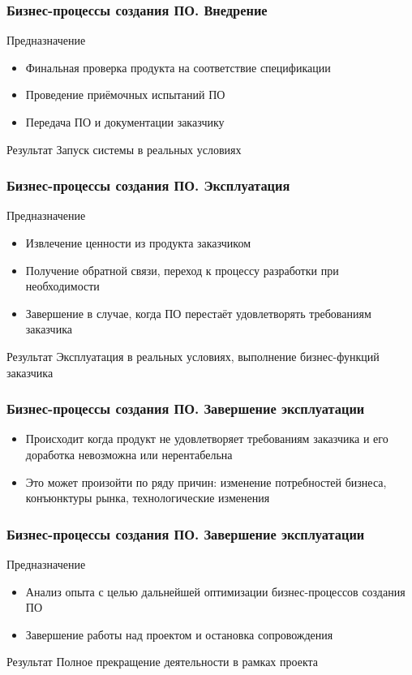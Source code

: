 \documentclass{../industrial-development}
\begin{document}
\begin{frame} \frametitle{Бизнес-процессы создания ПО. Внедрение}
	\begin{block}{Предназначение}
		\begin{itemize}
			\item Финальная проверка продукта на соответствие спецификации
			\item Проведение приёмочных испытаний ПО
			\item Передача ПО и документации заказчику
		\end{itemize}
	\end{block}
	\begin{block}{Результат}
		Запуск системы в реальных условиях
	\end{block}
\end{frame}
\lecturenotes


\begin{frame} \frametitle{Бизнес-процессы создания ПО. Эксплуатация}
	\begin{block}{Предназначение}
		\begin{itemize}
			\item Извлечение ценности из продукта заказчиком
			\item Получение обратной связи, переход к процессу разработки при необходимости
			\item Завершение в случае, когда ПО перестаёт удовлетворять требованиям заказчика
		\end{itemize}
	\end{block}
	\begin{block}{Результат}
		Эксплуатация в реальных условиях, выполнение бизнес-функций заказчика
	\end{block}
\end{frame}
\lecturenotes


\begin{frame} \frametitle{Бизнес-процессы создания ПО. Завершение эксплуатации}
	\begin{itemize}
		\item Происходит когда продукт не удовлетворяет требованиям заказчика и его доработка невозможна или нерентабельна
		\item Это может произойти по ряду причин: изменение потребностей бизнеса, конъюнктуры рынка, технологические изменения
	\end{itemize}
\end{frame}
\lecturenotes


\begin{frame} \frametitle{Бизнес-процессы создания ПО. Завершение эксплуатации}
	\begin{block}{Предназначение}
		\begin{itemize}
			\item Анализ опыта с целью дальнейшей оптимизации бизнес-процессов создания ПО
			\item Завершение работы над проектом и остановка сопровождения
		\end{itemize}
	\end{block}
	\begin{block}{Результат}
		Полное прекращение деятельности в рамках проекта
	\end{block}
\end{frame}
\lecturenotes
\end{document}
